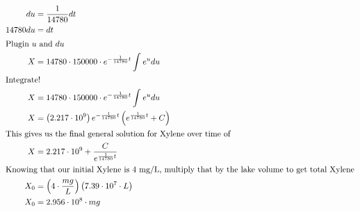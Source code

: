 \documentclass[12pt]{article}
\begin{document}
\begin{align}
  du                                                                                       & =\frac{1}{14780}dt                                                                                                                                                        \\
  14780du                                                                                  & =dt                                                                                                                                                                       \\
  \intertext{Plugin $u$ and $du$}
  X                                                                                        & =14780\cdot150000\cdot e^{-\frac{1}{14780}t}\int_{ }^{ }e^{u}du                                                                                                           \\
  \intertext{Integrate!}
  X                                                                                        & =14780\cdot150000\cdot e^{-\frac{1}{14780}t}\int_{ }^{ }e^{u}du                                                                                                           \\
  X                                                                                        & =\left(2.217\cdot10^{9}\right)e^{-\frac{1}{14780}t}\left(e^{\frac{1}{14780}t}+C\right)                                                                                    \\
  \intertext{This gives us the final general solution for Xylene over time of}
  X                                                                                        & =2.217\cdot10^{9}+\frac{C}{e^{\frac{1}{14780}t}}                                                                                                                          \\
  \intertext{Knowing that our initial Xylene is 4 mg/L, multiply that by the lake volume to get total Xylene}
  X_{0}                                                                                    & =\left(4\cdot\frac{mg}{L}\right)\left(7.39\cdot10^{7}\cdot L\right)                                                                                                       \\
  X_{0}                                                                                    & =2.956\cdot10^{8}\cdot mg                                                                                                                                                 \\

\end{align}
\end{document}
